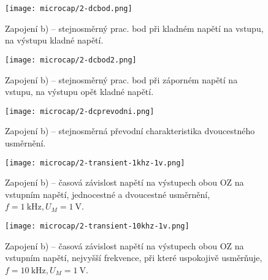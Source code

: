 
\begin{figure}[h!]
    \centering
    \texttt{[image: microcap/2-dcbod.png]}
    \caption{Zapojení b) -- stejnosměrný prac. bod při kladném napětí na vstupu, na výstupu kladné napětí.}
    \label{fig:microcap/.png}
\end{figure}

\begin{figure}[h!]
    \centering
    \texttt{[image: microcap/2-dcbod2.png]}
    \caption{Zapojení b) -- stejnosměrný prac. bod při záporném napětí na vstupu, na výstupu opět kladné napětí.}
    \label{fig:microcap/.png}
\end{figure}

\begin{figure}[h!]
    \centering
    \texttt{[image: microcap/2-dcprevodni.png]}
    \caption{Zapojení b) -- stejnosměrná převodní charakteristika dvoucestného usměrnění.}
    \label{fig:microcap/.png}
\end{figure}

\begin{figure}[h!]
    \centering
    \texttt{[image: microcap/2-transient-1khz-1v.png]}
    \caption{Zapojení b) -- časová závislost napětí na výstupech obou OZ na vstupním napětí, jednocestné a dvoucestné usměrnění, \(f=\qty{1}{\kilo\hertz}, U_M=\qty{1}{\volt}\).}
    \label{fig:microcap/.png}
\end{figure}


\begin{figure}[h!]
    \centering
    \texttt{[image: microcap/2-transient-10khz-1v.png]}
    \caption{Zapojení b) -- časová závislost napětí na výstupech obou OZ na vstupním napětí, nejvyšší frekvence, při které uspokojivě usměrňuje, \(f=\qty{10}{\kilo\hertz}, U_M=\qty{1}{\volt}\).}
    \label{fig:microcap/.png}
\end{figure}

